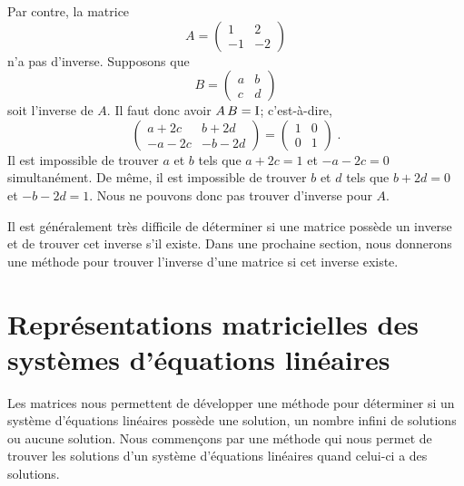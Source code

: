 {\begin{egg}
Par contre, la matrice
\[
A= \begin{pmatrix} 1 & 2 \\ -1 & -2 \end{pmatrix}
\]
n'a pas d'inverse.  Supposons que
\[
B = \begin{pmatrix} a & b \\ c & d \end{pmatrix}
\]
soit l'inverse de $A$.  Il faut donc avoir $A\,B = \operatorname{I}$;
c'est-à-dire,
\[
\begin{pmatrix} a + 2c & b+2d \\ -a-2c & -b-2d \end{pmatrix}
= \begin{pmatrix} 1 & 0 \\ 0 & 1 \end{pmatrix} \; .
\]
Il est impossible de trouver $a$ et $b$ tels que $a + 2c=1$ et $-a-2c
=0$ simultanément.  De même, il est impossible de trouver $b$ et $d$
tels que $b+2d =0$ et $-b-2d =1$.  Nous ne pouvons donc pas trouver
d'inverse pour $A$.
\end{egg}

Il est généralement très difficile de déterminer si une matrice
possède un inverse et de trouver cet inverse s'il existe.  Dans une
prochaine section, nous donnerons une méthode pour trouver l'inverse
d'une matrice si cet inverse existe.

\section[Représentations matricielles]{Représentations
  matricielles des systèmes d'équations linéaires}

Les matrices nous permettent de développer une méthode pour déterminer
si un système d'équations linéaires possède une solution, un nombre
infini de solutions ou aucune solution.    Nous commençons par 
une méthode qui nous permet de trouver les solutions d'un système
d'équations linéaires quand celui-ci a des solutions.

}
